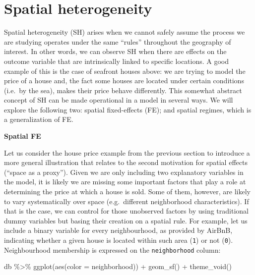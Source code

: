 \documentclass[
]{book}
\newenvironment{Shaded}{\begin{snugshade}}{\end{snugshade}}
\newcommand{\AttributeTok}[1]{\textcolor[rgb]{0.77,0.63,0.00}{#1}}
\newcommand{\FunctionTok}[1]{\textcolor[rgb]{0.00,0.00,0.00}{#1}}
\newcommand{\NormalTok}[1]{#1}
\newcommand{\SpecialCharTok}[1]{\textcolor[rgb]{0.00,0.00,0.00}{#1}}
\begin{document}
\hypertarget{spatial-heterogeneity-1}{%
\section{Spatial heterogeneity}\label{spatial-heterogeneity-1}}

Spatial heterogeneity (SH) arises when we cannot safely assume the process we are studying operates under the same ``rules'' throughout the geography of interest. In other words, we can observe SH when there are effects on the outcome variable that are intrinsically linked to specific locations. A good example of this is the case of seafront houses above: we are trying to model the price of a house and, the fact some houses are located under certain conditions (i.e.~by the sea), makes their price behave differently. This somewhat abstract concept of SH can be made operational in a model in several ways. We will explore the following two: spatial fixed-effects (FE); and spatial regimes, which is a generalization of FE.

\textbf{Spatial FE}

Let us consider the house price example from the previous section to introduce a more general illustration that relates to the second motivation for spatial effects (``space as a proxy''). Given we are only including two explanatory variables in the model, it is likely we are missing some important factors that play a role at determining the price at which a house is sold. Some of them, however, are likely to vary systematically over space (e.g.~different neighborhood characteristics). If that is the case, we can control for those unobserved factors by using traditional dummy variables but basing their creation on a spatial rule. For example, let us include a binary variable for every neighbourhood, as provided by AirBnB, indicating whether a given house is located within such area (\texttt{1}) or not (\texttt{0}). Neighbourhood membership is expressed on the \texttt{neighborhood} column:

\begin{Shaded}
\begin{Highlighting}[]
\NormalTok{db }\SpecialCharTok{\%\textgreater{}\%}
  \FunctionTok{ggplot}\NormalTok{(}\FunctionTok{aes}\NormalTok{(}\AttributeTok{color =}\NormalTok{ neighborhood)) }\SpecialCharTok{+}
  \FunctionTok{geom\_sf}\NormalTok{() }\SpecialCharTok{+} 
  \FunctionTok{theme\_void}\NormalTok{()}
\end{Highlighting}
\end{Shaded}
\end{document}
